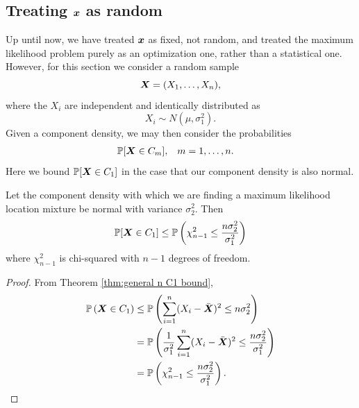 	\subsection{Treating \texorpdfstring{${\bm{{x}}}$}{x} as random}

		Up until now, we have treated ${\bm{{x}}}$ as fixed, not random, and treated the maximum likelihood problem purely as an optimization one, rather than a statistical one. However, for this section we consider a random sample
		\begin{equation}
			{\bm{{X}}} = (X_1, \dots, X_n),
		\end{equation}
		where the $X_i$ are independent and identically distributed as %
		\begin{equation}
			X_i \sim N(\mu, \sigma_1^2).
		\end{equation}
		Given a component density, we may then consider the probabilities
		\begin{align}
			&\mathbb{P}[{\bm{{X}}} \in C_m],	&&m = 1,\dots,n.
		\end{align}
		Here we bound $\mathbb{P}[{\bm{{X}}} \in C_1]$ in the case that our component density is also normal.
		
		\begin{theorem}
		\label{thm:probability in C1}
			Let the component density with which we are finding a maximum likelihood location mixture be normal with variance $\sigma_2^2$. Then 
			\begin{equation}
				\mathbb{P}[{\bm{{X}}} \in C_1] \leq \mathbb{P}\left(\chi_{n-1}^2 \leq \frac{n \sigma_2^2}{\sigma_1^2}\right)
			\end{equation}
			where $\chi_{n-1}^2$ is chi-squared with $n-1$ degrees of freedom.
		\end{theorem}
		\begin{proof}
			From Theorem \ref{thm:general n C1 bound},
			\begin{align}
			\mathbb{P}\left({\bm{{X}}} \in C_1 \right) &\leq \mathbb{P} \left( \sum_{i=1}^n (X_i - \bar{{\bm{{X}}}})^2 \leq n \sigma_2^2  \right) \\
				&= \mathbb{P}\left( \frac{1}{\sigma_1^2}\sum_{i=1}^n (X_i - \bar{{\bm{{X}}}})^2 \leq \frac{n \sigma_2^2}{\sigma_1^2}\right)\\
				&= \mathbb{P}\left(\chi_{n-1}^2  \leq \frac{n \sigma_2^2}{\sigma_1^2} \right).
			\end{align}
		\end{proof}

